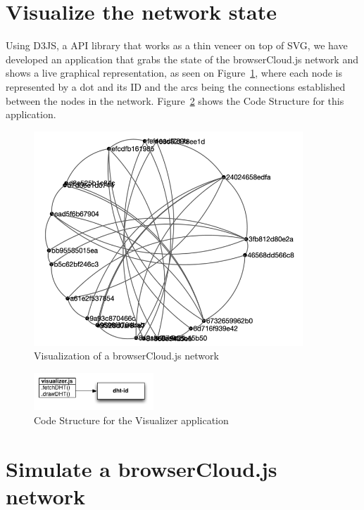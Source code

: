 \section{Visualize the network state}

Using D3JS, a API library that works as a thin veneer on top of SVG, we have developed an application that grabs the state of the browserCloud.js network and shows a live graphical representation, as seen on Figure~\ref{fig:visualizer}, where each node is represented by a dot and its ID and the arcs being the connections established between the nodes in the network. Figure~\ref{fig:d-v} shows the Code Structure for this application.

\begin{figure}[h!]
  \centering
  \includegraphics[width=0.9\textwidth]{figs/visualizer}
  \caption{Visualization of a browserCloud.js network}
  \label{fig:visualizer}
\end{figure}

\begin{figure}[h!]
  \centering
  \includegraphics[width=0.4\textwidth]{figs/diagram-visualizer}
  \caption{Code Structure for the Visualizer application}
  \label{fig:d-v}
\end{figure}

\section{Simulate a browserCloud.js network}

